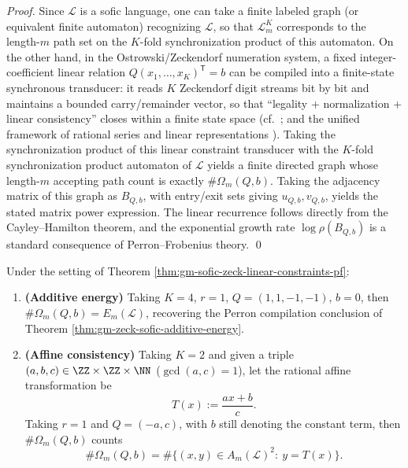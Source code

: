\begin{proof}
Since \(\mathcal{L}\) is a sofic language, one can take a finite labeled graph (or equivalent finite automaton) recognizing \(\mathcal{L}\), so that \(\mathcal{L}_m^K\) corresponds to the length-\(m\) path set on the \(K\)-fold synchronization product of this automaton.
On the other hand, in the Ostrowski/Zeckendorf numeration system, a fixed integer-coefficient linear relation
\(
Q(x_1,\dots,x_K)^{\mathsf T}=b
\)
can be compiled into a finite-state synchronous transducer: it reads \(K\) Zeckendorf digit streams bit by bit and maintains a bounded carry/remainder vector, so that ``legality + normalization + linear consistency'' closes within a finite state space (cf.\ \cite{Frougny1999OnlineAddition,AhlbachUsatineFrougnyPippenger2013,BaranwalaSchaefferShallit2021OstrowskiAutomatic}; and the unified framework of rational series and linear representations \cite{BerstelReutenauer1988RationalSeries}).
Taking the synchronization product of this linear constraint transducer with the \(K\)-fold synchronization product automaton of \(\mathcal{L}\) yields a finite directed graph whose length-\(m\) accepting path count is exactly \(\#\Omega_m(Q,b)\).
Taking the adjacency matrix of this graph as \(B_{Q,b}\), with entry/exit sets giving \(u_{Q,b},v_{Q,b}\), yields the stated matrix power expression.
The linear recurrence follows directly from the Cayley--Hamilton theorem, and the exponential growth rate \(\log\rho(B_{Q,b})\) is a standard consequence of Perron--Frobenius theory. \qed
\end{proof}

\begin{corollary}\label{cor:gm-linear-constraints-special-cases}
Under the setting of Theorem \ref{thm:gm-sofic-zeck-linear-constraints-pf}:
\begin{enumerate}
  \item \textbf{(Additive energy)} Taking \(K=4\), \(r=1\), \(Q=(1,1,-1,-1)\), \(b=0\), then \(\#\Omega_m(Q,b)=E_m(\mathcal{L})\), recovering the Perron compilation conclusion of Theorem \ref{thm:gm-zeck-sofic-additive-energy}.
  \item \textbf{(Affine consistency)} Taking \(K=2\) and given a triple \((a,b,c)\in\ZZ\times\ZZ\times\NN\) (\(\gcd(a,c)=1\)), let the rational affine transformation be
  \[
  T(x):=\frac{ax+b}{c}.
  \]
  Taking \(r=1\) and \(Q=(-a,c)\), with \(b\) still denoting the constant term, then \(\#\Omega_m(Q,b)\) counts
  \[
  \#\Omega_m(Q,b)=\#\{(x,y)\in A_m(\mathcal{L})^2:\ y=T(x)\}.
  \]
\end{enumerate}
\end{corollary}

